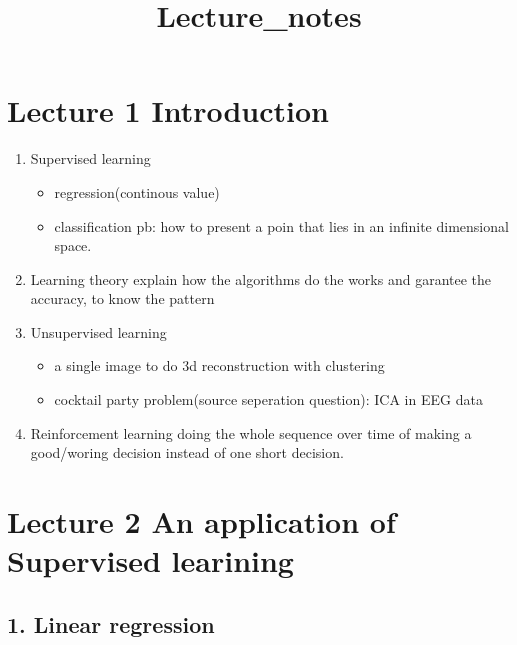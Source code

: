 \documentclass[11pt]{article}
\title{Lecture\_notes}
\providecommand{\tightlist}{%
      \setlength{\itemsep}{0pt}\setlength{\parskip}{0pt}}
\begin{document}
    
    
    \maketitle
    
    

    
    \section{Lecture 1 Introduction}\label{lecture-1-introduction}

\begin{enumerate}
\def\labelenumi{\arabic{enumi}.}
\item
  Supervised learning

  \begin{itemize}
  \tightlist
  \item
    regression(continous value)
  \item
    classification pb: how to present a poin that lies in an infinite
    dimensional space.
  \end{itemize}
\item
  Learning theory explain how the algorithms do the works and garantee
  the accuracy, to know the pattern
\item
  Unsupervised learning

  \begin{itemize}
  \tightlist
  \item
    a single image to do 3d reconstruction with clustering
  \item
    cocktail party problem(source seperation question): ICA in EEG data
  \end{itemize}
\item
  Reinforcement learning doing the whole sequence over time of making a
  good/woring decision instead of one short decision.
\end{enumerate}

    \section{Lecture 2 An application of Supervised
learining}\label{lecture-2-an-application-of-supervised-learining}

\subsection{1. Linear regression}\label{linear-regression}
\end{document}
